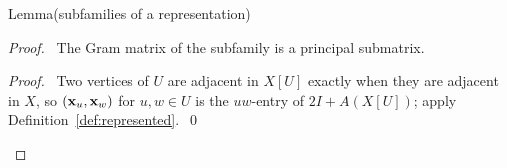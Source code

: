 \begin{namedresult}{Lemma}{(subfamilies of a representation)}\label{lem:4-sub}
\end{namedresult}
\begin{proof}
 \pfsketch\ The Gram matrix of the subfamily is a principal submatrix.
 \qedstep
 \begin{proof}\pf\ Two vertices of $U$ are adjacent in $X[U]$ exactly when they are adjacent in
  $X$, so $({\mathbf x}_u,{\mathbf x}_w)$ for $u,w\in U$ is the $uw$-entry of $2I+A(X[U])$; apply
  Definition~\ref{def:represented}.~\qed\end{proof}
\end{proof}

